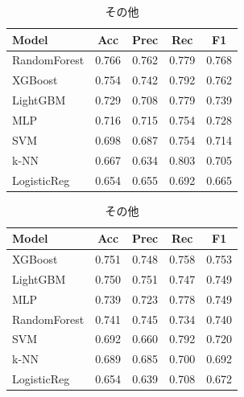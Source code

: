 \documentclass[uplatex, dvipdfmx, 11pt, a4paper, report]{jsbook}
\begin{document}
\begin{table}[H]
  \small
  \begin{minipage}[t]{0.49\textwidth}
    \centering
    \caption{リプレイ}
    \begin{tabular}{l|c|c|c|c} \hline
      Model & Acc & Prec & Rec & F1 \\ \hline
      RandomForest & 0.766 & 0.762 & 0.779 & 0.768 \\
      XGBoost & 0.754 & 0.742 & 0.792 & 0.762 \\
      LightGBM & 0.729 & 0.708 & 0.779 & 0.739 \\
      MLP & 0.716 & 0.715 & 0.754 & 0.728 \\
      SVM & 0.698 & 0.687 & 0.754 & 0.714 \\
      k-NN & 0.667 & 0.634 & 0.803 & 0.705 \\
      LogisticReg & 0.654 & 0.655 & 0.692 & 0.665 \\ \hline
    \end{tabular}
  \end{minipage}
  \hfill
  \begin{minipage}[t]{0.49\textwidth}
    \centering
    \caption{その他}
    \begin{tabular}{l|c|c|c|c} \hline
      Model & Acc & Prec & Rec & F1 \\ \hline
      XGBoost & 0.751 & 0.748 & 0.758 & 0.753 \\
      LightGBM & 0.750 & 0.751 & 0.747 & 0.749 \\
      MLP & 0.739 & 0.723 & 0.778 & 0.749 \\
      RandomForest & 0.741 & 0.745 & 0.734 & 0.740 \\
      SVM & 0.692 & 0.660 & 0.792 & 0.720 \\
      k-NN & 0.689 & 0.685 & 0.700 & 0.692 \\
      LogisticReg & 0.654 & 0.639 & 0.708 & 0.672 \\ \hline
    \end{tabular}
  \end{minipage}
\end{table}
\end{document}
